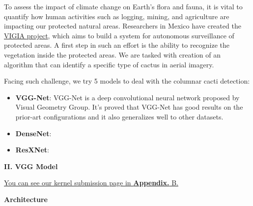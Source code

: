 \documentclass[a4paper]{article}
\begin{document}
\large{\noindent To assess the impact of climate change on Earth's flora and fauna, it is vital to quantify how human activities such as logging, mining, and agriculture are impacting our protected natural areas. Researchers in Mexico have created the \href{https://jivg.org/research-projects/vigia/}{VIGIA project}, which aims to build a system for autonomous surveillance of protected areas. A first step in such an effort is the ability to recognize the vegetation inside the protected areas. We are tasked with creation of an algorithm that can identify a specific type of cactus in aerial imagery. 

Facing such challenge, we try 5 models to deal with the columnar cacti detection:

\begin{itemize}
    \item \textbf{VGG-Net}: \textsf{VGG-Net} is a deep convolutional neural network proposed by Visual Geometry Group. It's proved that \textsf{VGG-Net} has good results on the prior-art configurations and it also generalizes well to other datasets.
    \item \textbf{DenseNet}: 
    \item \textbf{ResXNet}: 
\end{itemize}

}



\clearpage

\vspace{5mm}
\begin{center}
\LARGE\textbf{II. VGG Model} \\
\end{center}
\vspace{2mm}

\large{\underline{You can see our kernel submission page in \textbf{Appendix.} B.}}

\vspace{2mm}
\begin{center}
\large\textbf{Architecture} \\
\end{center}
\end{document}
